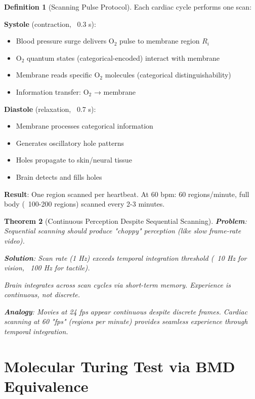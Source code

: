 \documentclass[11pt,a4paper]{article}
\newtheorem{theorem}{Theorem}[section]
\theoremstyle{definition}
\newtheorem{definition}[theorem]{Definition}
\theoremstyle{remark}
\begin{document}
\begin{definition}[Scanning Pulse Protocol]
Each cardiac cycle performs one scan:

\textbf{Systole} (contraction, ~0.3 s):
\begin{itemize}
\item Blood pressure surge delivers O$_2$ pulse to membrane region $R_i$
\item O$_2$ quantum states (categorical-encoded) interact with membrane
\item Membrane reads specific O$_2$ molecules (categorical distinguishability)
\item Information transfer: O$_2$ → membrane
\end{itemize}

\textbf{Diastole} (relaxation, ~0.7 s):
\begin{itemize}
\item Membrane processes categorical information
\item Generates oscillatory hole patterns
\item Holes propagate to skin/neural tissue
\item Brain detects and fills holes
\end{itemize}

\textbf{Result}: One region scanned per heartbeat. At 60 bpm: 60 regions/minute, full body (~100-200 regions) scanned every 2-3 minutes.
\end{definition}

\begin{theorem}[Continuous Perception Despite Sequential Scanning]
\textbf{Problem}: Sequential scanning should produce "choppy" perception (like slow frame-rate video).

\textbf{Solution}: Scan rate (1 Hz) exceeds temporal integration threshold (~10 Hz for vision, ~100 Hz for tactile).

Brain integrates across scan cycles via short-term memory. Experience is continuous, not discrete.

\textbf{Analogy}: Movies at 24 fps appear continuous despite discrete frames. Cardiac scanning at 60 "fps" (regions per minute) provides seamless experience through temporal integration.
\end{theorem}

\section{Molecular Turing Test via BMD Equivalence}
\end{document}
